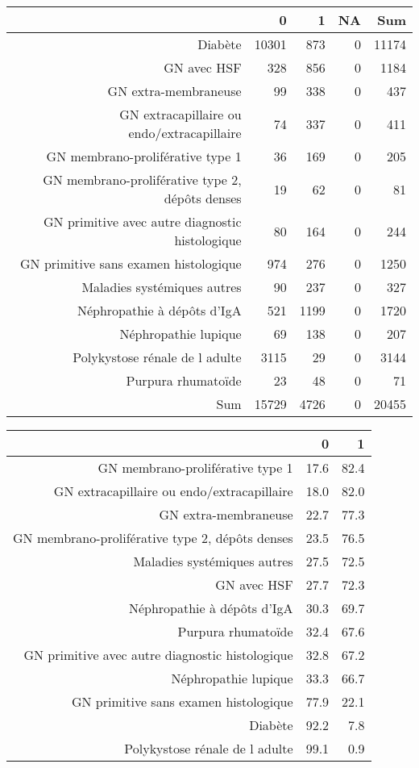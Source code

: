 \documentclass[11pt,a4paper]{article}\usepackage[]{graphicx}\usepackage[]{color}
\begin{document}
\begin{table}[H]
\centering
\begin{tabular}{rrrrr}
  \hline
 & 0 & 1 & NA & Sum \\ 
  \hline
Diabète & 10301 & 873 & 0 & 11174 \\ 
  GN avec HSF & 328 & 856 & 0 & 1184 \\ 
  GN extra-membraneuse & 99 & 338 & 0 & 437 \\ 
  GN extracapillaire ou endo/extracapillaire & 74 & 337 & 0 & 411 \\ 
  GN membrano-proliférative type 1 & 36 & 169 & 0 & 205 \\ 
  GN membrano-proliférative type 2, dépôts denses & 19 & 62 & 0 & 81 \\ 
  GN primitive avec autre diagnostic histologique & 80 & 164 & 0 & 244 \\ 
  GN primitive sans examen histologique & 974 & 276 & 0 & 1250 \\ 
  Maladies systémiques autres & 90 & 237 & 0 & 327 \\ 
  Néphropathie à dépôts d'IgA & 521 & 1199 & 0 & 1720 \\ 
  Néphropathie lupique & 69 & 138 & 0 & 207 \\ 
  Polykystose rénale de l adulte & 3115 & 29 & 0 & 3144 \\ 
  Purpura rhumatoïde & 23 & 48 & 0 & 71 \\ 
  Sum & 15729 & 4726 & 0 & 20455 \\ 
   \hline
\end{tabular}
\end{table}
\begin{table}[H]
\centering
\begin{tabular}{rrr}
  \hline
 & 0 & 1 \\ 
  \hline
GN membrano-proliférative type 1 & 17.6 & 82.4 \\ 
  GN extracapillaire ou endo/extracapillaire & 18.0 & 82.0 \\ 
  GN extra-membraneuse & 22.7 & 77.3 \\ 
  GN membrano-proliférative type 2, dépôts denses & 23.5 & 76.5 \\ 
  Maladies systémiques autres & 27.5 & 72.5 \\ 
  GN avec HSF & 27.7 & 72.3 \\ 
  Néphropathie à dépôts d'IgA & 30.3 & 69.7 \\ 
  Purpura rhumatoïde & 32.4 & 67.6 \\ 
  GN primitive avec autre diagnostic histologique & 32.8 & 67.2 \\ 
  Néphropathie lupique & 33.3 & 66.7 \\ 
  GN primitive sans examen histologique & 77.9 & 22.1 \\ 
  Diabète & 92.2 & 7.8 \\ 
  Polykystose rénale de l adulte & 99.1 & 0.9 \\ 
   \hline
\end{tabular}
\end{table}
\end{document}
